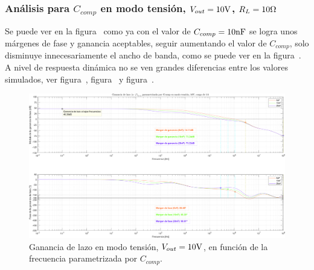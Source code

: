 
\subsubsection{Análisis para $C_{comp}$ en modo tensión, $V_{out} = 10 \si[per-mode=symbol]{\volt}$, $R_{L} = 10 \si[per-mode=symbol]{\ohm}$}

Se puede ver en la figura~ como ya con el valor de $C_{comp} = 10 \si[per-mode=symbol]{\nano\farad}$ se logra unos márgenes de fase y ganancia aceptables, seguir aumentando el valor de $C_{comp}$, solo disminuye innecesariamente el ancho de banda, como se puede ver en la figura~. A nivel de respuesta dinámica no se ven grandes diferencias entre los valores simulados, ver figura~, figura~ y figura~.

\vfill



\clearpage

\begin{figure}[H] %
\begin{center}
\includegraphics[width=1.1 \textwidth, angle=90]{./img/plots/loop/power_supply_CCOMP_LOOP_Modo1.png}
\caption{\label{fig:fig_power_supply_CCOMP_LOOP_Modo1}\footnotesize{Ganancia de lazo en modo tensión, $V_{out} = 10 \si[per-mode=symbol]{\volt}$, en función de la frecuencia parametrizada por $C_{comp}$.}}
\end{center}
\end{figure}


\clearpage


